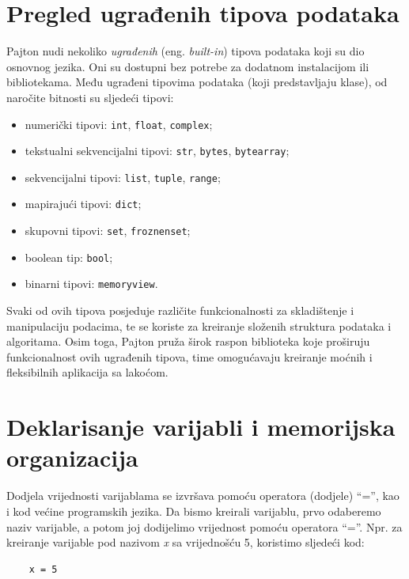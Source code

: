 \section{Pregled ugrađenih tipova podataka}

Pajton nudi nekoliko \textit{ugrađenih} (eng. \textit{built-in}) tipova podataka koji su dio osnovnog jezika. Oni su dostupni bez potrebe za dodatnom instalacijom ili bibliotekama. Među ugrađeni tipovima podataka (koji predstavljaju klase), od naročite bitnosti su sljedeći tipovi:

\begin{itemize}
	\item  numerički tipovi: \texttt{int}, \texttt{float}, \texttt{complex};
	 \item  tekstualni sekvencijalni tipovi: \texttt{str}, \texttt{bytes}, \texttt{bytearray};
	\item  sekvencijalni tipovi: \texttt{list}, \texttt{tuple}, \texttt{range}; 
	\item  mapirajući tipovi: \texttt{dict};
	\item skupovni tipovi: \texttt{set}, \texttt{froznenset};
	\item  boolean tip: \texttt{bool};
	\item  binarni tipovi: \texttt{memoryview}.
\end{itemize}


Svaki od ovih tipova posjeduje različite funkcionalnosti za skladištenje i manipulaciju podacima, te se koriste za kreiranje složenih struktura podataka i algoritama. Osim toga, Pajton pruža širok raspon biblioteka koje proširuju funkcionalnost ovih ugrađenih tipova, time omogućavaju kreiranje moćnih i fleksibilnih aplikacija sa lakoćom.

\section{Deklarisanje varijabli i memorijska organizacija}

Dodjela vrijednosti varijablama se izvršava pomoću operatora (dodjele) ``='', kao i kod većine programskih jezika. Da bismo kreirali varijablu, prvo odaberemo naziv varijable, a potom joj dodijelimo vrijednost pomoću operatora ``=''. Npr. za kreiranje varijable pod nazivom \textit{x} sa vrijednošću   5, koristimo sljedeći kod:

\begin{verbatim}
	x = 5
\end{verbatim}

